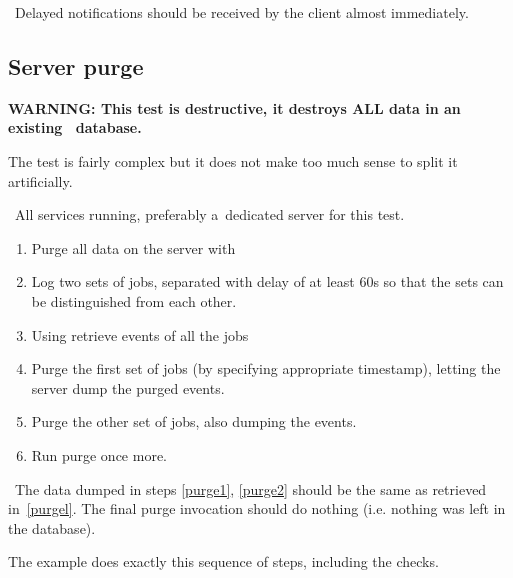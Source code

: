 \result\ Delayed notifications should be received by the client almost
immediately.

\subsection{Server purge}

\textbf{WARNING: This test is destructive, it destroys ALL data in an
existing \LB\ database.} 

The test is fairly complex but it does not make too much sense to split it
artificially.

\req\ All \LB services running, preferably a~dedicated server for this test.

\how
\begin{enumerate}
\item Purge all data on the server with 
\item Log two sets of jobs, separated with delay of at least 60s so
that the sets can be distinguished from each other.
\item \label{purgel}
Using  retrieve events of all the jobs
\item \label{purge1}
Purge the first set of jobs (by specifying appropriate timestamp),
letting the server dump the purged events.
\item \label{purge2} Purge the other set of jobs, also dumping the events.
\item \label{purge3} Run purge once more.
\end{enumerate}

\result\ The data dumped in steps \ref{purge1}, \ref{purge2} should be the
same as retrieved in~\ref{purgel}. The final purge invocation should
do nothing (i.e. nothing was left in the database).

\begin{hints}
The example  does exactly this sequence of steps,
including the checks.
\end{hints}
